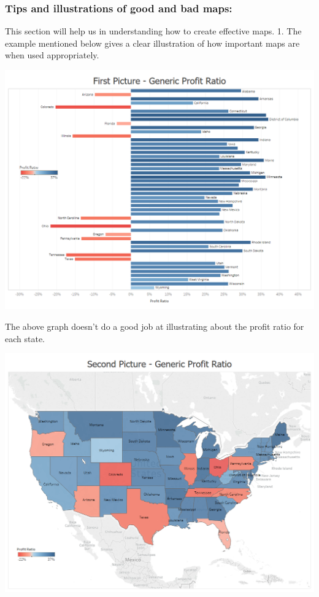 \documentclass[]{book}
\begin{document}
\hypertarget{tips-and-illustrations-of-good-and-bad-maps}{%
\subsubsection{Tips and illustrations of good and bad maps:}\label{tips-and-illustrations-of-good-and-bad-maps}}

This section will help us in understanding how to create effective maps.
1. The example mentioned below gives a clear illustration of how important maps are when used appropriately.

\includegraphics{images/profit_ratio.png}

The above graph doesn't do a good job at illustrating about the profit ratio for each state.

\includegraphics{images/profit_ratio_map.png}
\end{document}
